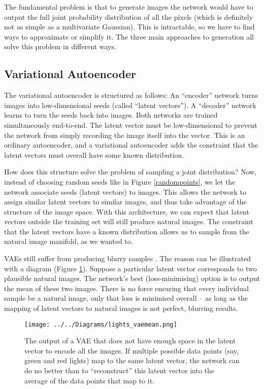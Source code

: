 \documentclass[11pt, a4paper]{book}
\newcommand{\nquote}[1]{``{#1}''}
\begin{document}
The fundamental problem is that to generate images the network would have to output the full joint probability distribution of all the pixels (which is definitely not as simple as a multivariate Gaussian). This is intractable, so we have to find ways to approximate or simplify it. The three main approaches to generation all solve this problem in different ways.

\subsection{Variational Autoencoder}

The variational autoencoder \citep{vae} is structured as follows: An \nquote{encoder} network turns images into low-dimensional seeds (called \nquote{latent vectors}). A \nquote{decoder} network learns to turn the seeds back into images. Both networks are trained simultaneously end-to-end. The latent vector must be low-dimensional to prevent the network from simply recording the image itself into the vector. This is an ordinary autoencoder, and a variational autoencoder adds the constraint that the latent vectors must overall have some known distribution.

How does this structure solve the problem of sampling a joint distribution? Now, instead of choosing random seeds like in Figure \ref{randompoints}, we let the network associate seeds (latent vectors) to images. This allows the network to assign similar latent vectors to similar images, and thus take advantage of the structure of the image space. With this architecture, we can expect that latent vectors outside the training set will still produce natural images. The constraint that the latent vectors have a known distribution allows us to sample from the natural image manifold, as we wanted to.

VAEs still suffer from producing blurry samples \citep{vaeunderstanding}. The reason can be illustrated with a diagram (Figure \ref{vaemean}). Suppose a particular latent vector corresponds to two plausible natural images. The network's best (loss-minimising) option is to output the mean of these two images. There is no force ensuring that every individual sample be a natural image, only that loss is minimised overall -- as long as the mapping of latent vectors to natural images is not perfect, blurring results.

\begin{figure}
  \centering
  \texttt{[image: ../../Diagrams/lights\_vaemean.png]}
  \caption[Output of a VAE]{The output of a VAE that does not have enough space in the latent vector to encode all the images. If multiple possible data points (say, green and red lights) map to the same latent vector, the network can do no better than to \nquote{reconstruct} this latent vector into the average of the data points that map to it.}
  \label{vaemean}
\end{figure}
\end{document}
